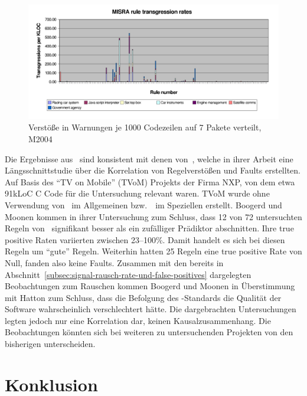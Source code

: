 \documentclass[a4paper,UKenglish,cleveref, autoref]{templates/lipics-v2019}
\begin{document}
    \begin{figure}[H]
        \centering
        \captionsetup{justification=centering,margin=2cm}
        \includegraphics[width=\textwidth]{graphics/2004-transgression-rates.png}
        \caption{Verstöße in Warnungen je 1000 Codezeilen auf 7 Pakete verteilt, M2004\cite{hatton2007language}}
        \label{fig:2004-transgression-rates}
    \end{figure}

    Die Ergebnisse aus~\cite{hatton2007language} sind konsistent mit denen von~\cite{boogerd2008assessing}, welche in
    ihrer Arbeit eine Längsschnittstudie über die Korrelation von Regelverstößen und Faults erstellten.
    Auf Basis des \enquote{TV on Mobile} (TVoM) Projekts der Firma NXP, von dem etwa 91kLoC C Code für die Untersuchung relevant waren.
    TVoM wurde ohne Verwendung von \sqss\ im Allgemeinen bzw.\ \misra\ im Speziellen erstellt.
    Boogerd und Moonen kommen in ihrer Untersuchung zum Schluss, dass 12 von 72 untersuchten Regeln von \misra\ signifikant
    besser als ein zufälliger Prädiktor abschnitten.
    Ihre true positive Raten variierten zwischen 23--100\%.
    Damit handelt es sich bei diesen Regeln um \enquote{gute} Regeln.
    Weiterhin hatten 25 Regeln eine true positive Rate von Null, fanden also keine Faults.
    Zusammen mit den bereits in Abschnitt~\ref{subsec:signal-rausch-rate-und-false-positives} dargelegten Beobachtungen zum
    Rauschen kommen Boogerd und Moonen in Überstimmung mit Hatton zum Schluss, dass die Befolgung des \misra-Standards
    die Qualität der Software wahrscheinlich verschlechtert hätte.
    Die dargebrachten Untersuchungen legten jedoch nur eine Korrelation dar, keinen Kausalzusammenhang.
    Die Beobachtungen könnten sich bei weiteren zu untersuchenden Projekten von den bisherigen unterscheiden.

    \section{Konklusion}
    \label{sec:konklusion}




    
\end{document}
